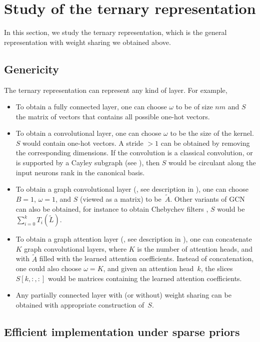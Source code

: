 \section{Study of the ternary representation}
\label{sec:ternary}

In this section, we study the ternary representation, which is the general representation with weight sharing we obtained above.

\subsection{Genericity}

The ternary representation can represent any kind of layer. For example,
\begin{itemize}
\item To obtain a fully connected layer, one can choose $\omega$ to be of size $nm$ and $S$ the matrix of vectors that contains all possible one-hot vectors.
\item To obtain a convolutional layer, one can choose $\omega$ to be the size of the kernel. $S$ would contain one-hot vectors. A stride $> 1$ can be obtained by removing the corresponding dimensions. If the convolution is a classical convolution, or is supported by a Cayley subgraph (see ), then $S$ would be circulant along the input neurons rank in the canonical basis.
\item To obtain a graph convolutional layer (\cite{kipf2016semi}, see description in ), one can choose $B = 1$, $\omega = 1$, and $S$ (viewed as a matrix) to be~$\widetilde{A}$. Other variants of GCN can also be obtained, for instance to obtain Chebychev filters \citep{defferrard2016convolutional}, $S$ would be $\sum_{i=0}^k T_i(\widetilde{L})$.
\item To obtain a graph attention layer (\cite{velickovic2017graph}, see description in ), one can concatenate $K$ graph convolutional layers, where $K$ is the number of attention heads, and with $\widetilde{A}$ filled with the learned attention coefficients. Instead of concatenation, one could also choose $\omega=K$, and given an attention head~$k$, the slices $S[k,:,:]$ would be matrices containing the learned attention coefficients.
\item Any partially connected layer with (or without) weight sharing can be obtained with appropriate construction of~$S$.
\end{itemize}

\subsection{Efficient implementation under sparse priors}

